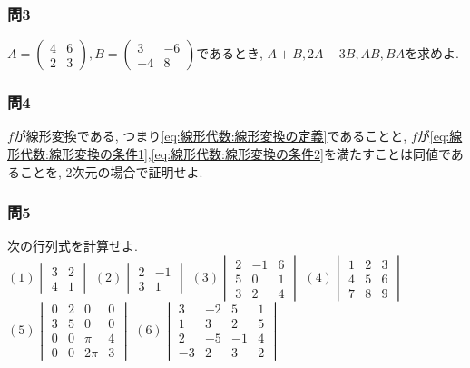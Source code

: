     \subsubsection*{問3}$A=\begin{pmatrix}4 & 6\\2 & 3\end{pmatrix},B=\begin{pmatrix}3 & -6\\-4 & 8\end{pmatrix}$であるとき, $A+B,2A-3B,AB,BA$を求めよ.
    
    \subsubsection*{問4}$f$が線形変換である, つまり\eqref{eq:線形代数:線形変換の定義}であることと, $f$が\eqref{eq:線形代数:線形変換の条件1},\eqref{eq:線形代数:線形変換の条件2}を満たすことは同値であることを, 2次元の場合で証明せよ.

    \subsubsection*{問5}次の行列式を計算せよ.\\
        $(1)\begin{vmatrix}3 & 2 \\ 4 & 1\end{vmatrix}$\hspace{1mm}
        $(2)\begin{vmatrix}2 & -1\\ 3 & 1\end{vmatrix}$\hspace{1mm}
        $(3)\begin{vmatrix}2 & -1 & 6 \\ 5 & 0 & 1 \\ 3 & 2 & 4\end{vmatrix}$\hspace{1mm}
        $(4)\begin{vmatrix}1 & 2 & 3 \\ 4 & 5 & 6 \\ 7 & 8 & 9\end{vmatrix}$\hspace{1mm}
        $(5)\begin{vmatrix}0 & 2 & 0 & 0 \\ 3 & 5 & 0 & 0 \\ 0 & 0 & \pi &4 \\ 0 & 0 & 2\pi & 3\end{vmatrix}$\hspace{1mm}
        $(6)\begin{vmatrix}3 & -2 & 5 & 1 \\ 1 & 3 & 2 & 5 \\ 2 & -5 & -1 & 4 \\ -3 & 2 & 3 & 2\end{vmatrix}$
